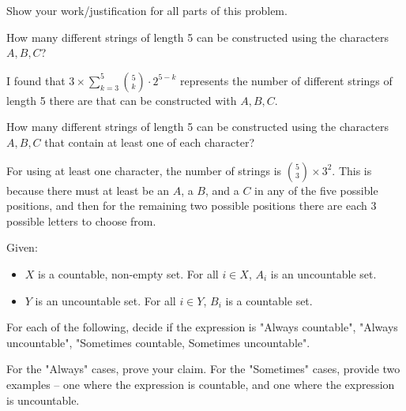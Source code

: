 \documentclass[11pt]{article}
\begin{document}

Show your work/justification for all parts of this problem.
\begin{Parts}
    \Part How many different strings of length 5 can be constructed using the 
    characters $A, B, C$?

    \begin{solution}
        I found that $3 \times \sum_{k=3}^{5} \binom{5}{k} \cdot 2^{5-k}$ 
        represents the number of different strings of length 5 there are that 
        can be constructed with $A, B, C$. 
    \end{solution}

    \Part How many different strings of length 5 can be constructed using the 
    characters $A, B, C$ that contain at least one of each character?

    \begin{solution}
        For using at least one character, the number of strings is $\binom{5}{3}
        \times 3^2$. This is because there must at least be an $A$, a $B$, and 
        a $C$ in any of the five possible positions, and then for the remaining 
        two possible positions there are each 3 possible letters to choose from. 
    \end{solution}
\end{Parts}


Given:
\begin{itemize}
\item $X$ is a countable, non-empty set. For all $i \in X$, $A_i$ is an uncountable set.
\item $Y$ is an uncountable set. For all $i \in Y$, $B_i$ is a countable set.
\end{itemize}

For each of the following, decide if the expression is
"Always countable", "Always uncountable", "Sometimes countable,
Sometimes uncountable".

For the "Always" cases, prove your claim. For the "Sometimes" cases, provide
two examples -- one where the expression is countable, and one where
the expression is uncountable.
\end{document}
